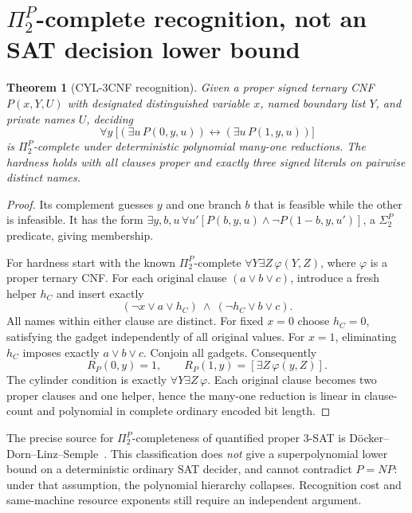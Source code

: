 \documentclass[11pt]{article}
\newtheorem{theorem}{Theorem}
\begin{document}
\section{\(\Pi_2^P\)-complete recognition, not an SAT decision lower bound}
\begin{theorem}[CYL-3CNF recognition]\label{th:ph}
Given a proper signed ternary CNF \(P(x,Y,U)\) with designated distinguished
variable \(x\), named boundary list \(Y\), and private names \(U\), deciding
\[
 \forall y\ \bigl[
  (\exists u\,P(0,y,u))\leftrightarrow
  (\exists u\,P(1,y,u))\bigr] \tag{4}
\]
is \(\Pi_2^P\)-complete under deterministic polynomial many-one reductions.
The hardness holds with all clauses proper and exactly three signed
literals on pairwise distinct names.
\end{theorem}
\begin{proof}
Its complement guesses \(y\) and one branch \(b\) that is feasible while
the other is infeasible. It has the form
\(\exists y,b,u\,\forall u'[
P(b,y,u)\wedge\neg P(1-b,y,u')]\), a \(\Sigma_2^P\)
predicate, giving membership.

For hardness start with the known \(\Pi_2^P\)-complete
\(\forall Y\exists Z\,\varphi(Y,Z)\), where \(\varphi\) is a proper
ternary CNF. For each original clause \((a\vee b\vee c)\), introduce
a fresh helper \(h_C\) and insert exactly
\[
 (\neg x\vee a\vee h_C)\ \wedge\
 (\neg h_C\vee b\vee c). \tag{5}
\]
All names within either clause are distinct. For fixed \(x=0\)
choose \(h_C=0\), satisfying the gadget independently of all original
values. For \(x=1\), eliminating \(h_C\) imposes exactly
\(a\vee b\vee c\). Conjoin all gadgets. Consequently
\[
 R_P(0,y)=1,\qquad
 R_P(1,y)=[\exists Z\,\varphi(y,Z)]. \tag{6}
\]
The cylinder condition is exactly \(\forall Y\exists Z\,\varphi\).
Each original clause becomes two proper clauses and one helper,
hence the many-one reduction is linear in clause-count and polynomial
in complete ordinary encoded bit length.
\end{proof}
The precise source for \(\Pi_2^P\)-completeness of quantified proper
3-SAT is D\"ocker--Dorn--Linz--Semple~\cite{qbf}. This classification
does \emph{not} give a superpolynomial lower bound on a deterministic
ordinary SAT decider, and cannot contradict \(P=NP\): under that assumption,
the polynomial hierarchy collapses. Recognition cost and same-machine
resource exponents still require an independent argument.
\end{document}
